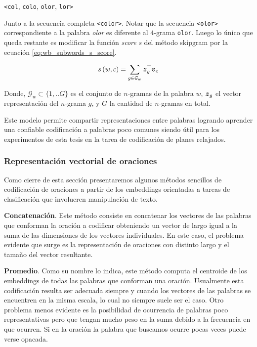 \begin{center}
    \verb|<col|, \verb|colo|, \verb|olor|, \verb|lor>|
\end{center}

Junto a la secuencia completa \verb|<color>|. Notar que la secuencia
\verb|<olor>| correspondiente a la palabra \emph{olor} es diferente al $4$-grama
\verb|olor|. Luego lo único que queda restante es modificar la función
\emph{score} $s$ del método skipgram por la ecuación
\ref{eq:wb_subwords_s_score}.

\begin{equation} \label{eq:wb_subwords_s_score}
    s\left(w, c\right) = \sum_{g \in \mathcal{G}_w} \boldsymbol{z}_g^{\top}\boldsymbol{v}_c
\end{equation}

Donde, $\mathcal{G}_w \subset \{1, .. G\}$ es el conjunto de $n$-gramas de la
palabra $w$, $\boldsymbol{z}_g$ el vector representación del $n$-grama $g$, y $G$ la
cantidad de $n$-gramas en total.

Este modelo permite compartir representaciones entre palabras logrando aprender
una confiable codificación a palabras poco comunes siendo útil para los
experimentos de esta tesis en la tarea de codificación de planes relajados.

\subsubsection{Representación vectorial de oraciones}
\label{lit:sentence_vector}

Como cierre de esta sección presentaremos algunos métodos sencillos de
codificación de oraciones a partir de los embeddings orientadas a tareas de
clasificación que involucren manipulación de texto.

\textbf{Concatenación}. Este método consiste en concatenar los vectores de las
palabras que conforman la oración a codificar obteniendo un vector de largo
igual a la suma de las dimensiones de los vectores individuales. En este caso,
el problema evidente que surge es la representación de oraciones con distinto
largo y el tamaño del vector resultante.

\textbf{Promedio}. Como su nombre lo indica, este método computa el centroide de
los embeddings de todas las palabras que conforman una oración. Usualmente esta
codificación resulta ser adecuada siempre y cuando los vectores de las palabras
se encuentren en la misma escala, lo cual no siempre suele ser el caso. Otro
problema menos evidente es la posibilidad de ocurrencia de palabras poco
representativas pero que tengan mucho peso en la suma debido a la frecuencia en
que ocurren. Si en la oración la palabra que buscamos ocurre pocas veces puede
verse opacada.

